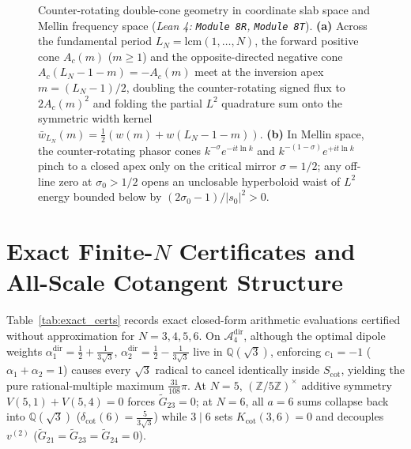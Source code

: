 \documentclass[11pt,a4paper]{article}
\theoremstyle{definition}
\newcommand{\Z}{\mathbb{Z}}
\newcommand{\Q}{\mathbb{Q}}
\begin{document}
\begin{figure}[htbp]
{%
}
\caption{Counter-rotating double-cone geometry in coordinate slab space and Mellin frequency space (\emph{Lean 4: \texttt{Module~8R}, \texttt{Module~8T}}). \textbf{(a)} Across the fundamental period $L_N = \mathrm{lcm}(1,\dots,N)$, the forward positive cone $A_c(m)$ ($m \ge 1$) and the opposite-directed negative cone $A_c(L_N-1-m) = -A_c(m)$ meet at the inversion apex $m = (L_N-1)/2$, doubling the counter-rotating signed flux to $2A_c(m)^2$ and folding the partial $L^2$ quadrature sum onto the symmetric width kernel $\bar{w}_{L_N}(m) = \frac{1}{2}(w(m) + w(L_N-1-m))$. \textbf{(b)} In Mellin space, the counter-rotating phasor cones $k^{-\sigma}e^{-it\ln k}$ and $k^{-(1-\sigma)}e^{+it\ln k}$ pinch to a closed apex only on the critical mirror $\sigma = 1/2$; any off-line zero at $\sigma_0 > 1/2$ opens an unclosable hyperboloid waist of $L^2$ energy bounded below by $(2\sigma_0 - 1)/|s_0|^2 > 0$.}
\label{fig:double_cone_counter_rotation}
\end{figure}

\section{Exact Finite-$N$ Certificates and All-Scale Cotangent Structure}\label{sec:certificates}

Table~\ref{tab:exact_certs} records exact closed-form arithmetic evaluations certified without approximation for $N = 3, 4, 5, 6$. On $\mathcal{A}_4^{\mathrm{dir}}$, although the optimal dipole weights $\alpha_1^{\mathrm{dir}} = \tfrac{1}{2}+\tfrac{1}{3\sqrt{3}}$, $\alpha_2^{\mathrm{dir}} = \tfrac{1}{2}-\tfrac{1}{3\sqrt{3}}$ live in $\Q(\sqrt{3})$, enforcing $c_1=-1$ ($\alpha_1+\alpha_2=1$) causes every $\sqrt{3}$ radical to cancel identically inside $S_{\mathrm{cot}}$, yielding the pure rational-multiple maximum $\tfrac{31}{108}\pi$. At $N=5$, $(\Z/5\Z)^\times$ additive symmetry $V(5,1)+V(5,4)=0$ forces $\widetilde{G}_{23}=0$; at $N=6$, all $a=6$ sums collapse back into $\Q(\sqrt{3})$ ($\delta_{\mathrm{cot}}(6)=\tfrac{5}{3\sqrt{3}}$) while $3\mid 6$ sets $K_{\mathrm{cot}}(3,6)=0$ and decouples $v^{(2)}$ ($\widetilde{G}_{21}=\widetilde{G}_{23}=\widetilde{G}_{24}=0$).
\end{document}
